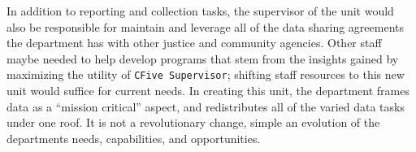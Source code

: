 \documentclass[12pt,]{article}
\begin{document}
In addition to reporting and collection tasks, the supervisor of the
unit would also be responsible for maintain and leverage all of the data
sharing agreements the department has with other justice and community
agencies. Other staff maybe needed to help develop programs that stem
from the insights gained by maximizing the utility of
\texttt{CFive\ Supervisor}; shifting staff resources to this new unit
would suffice for current needs. In creating this unit, the department
frames data as a ``mission critical'' aspect, and redistributes all of
the varied data tasks under one roof. It is not a revolutionary change,
simple an evolution of the departments needs, capabilities, and
opportunities.
\end{document}
